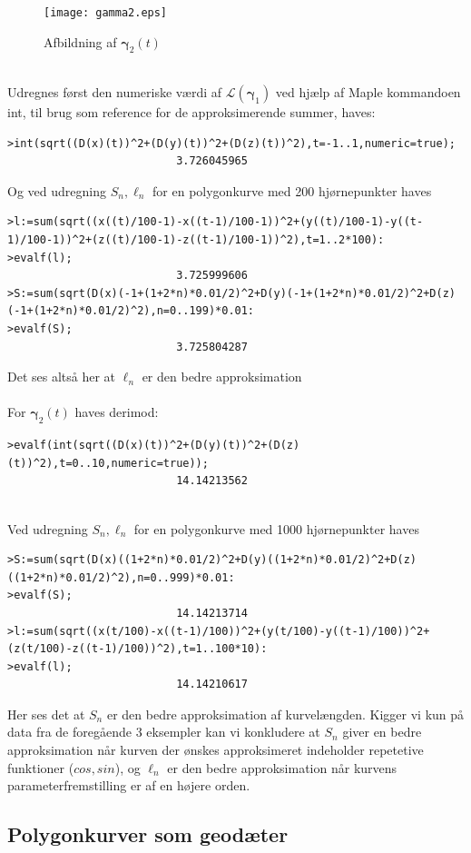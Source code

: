 \begin{figure}[ht]
\center
\texttt{[image: gamma2.eps]}
\caption{Afbildning af \(\pmb{\gamma}_2(t)\)}
\label{gamma2graf}
\end{figure}
\\
Udregnes først den numeriske værdi af \(\mathscr{L}(\pmb{\gamma}_1)\) ved hjælp af Maple kommandoen int, til brug som reference for de approksimerende summer, haves:
\begin{lstlisting}[caption=Reference til \(\mathscr{L}(\pmb{\gamma}_1)\)]
>int(sqrt((D(x)(t))^2+(D(y)(t))^2+(D(z)(t))^2),t=-1..1,numeric=true);
                          3.726045965

\end{lstlisting}
Og ved udregning \(S_n,\ell_n\) for en polygonkurve med 200 hjørnepunkter haves
\begin{lstlisting}[caption={Længden af polygonkurven udregnet hvor \( \mbox{l}=\ell_n\) og \(\mbox{S}=S_n\) }]
>l:=sum(sqrt((x((t)/100-1)-x((t-1)/100-1))^2+(y((t)/100-1)-y((t-1)/100-1))^2+(z((t)/100-1)-z((t-1)/100-1))^2),t=1..2*100):
>evalf(l);
                          3.725999606
>S:=sum(sqrt(D(x)(-1+(1+2*n)*0.01/2)^2+D(y)(-1+(1+2*n)*0.01/2)^2+D(z)(-1+(1+2*n)*0.01/2)^2),n=0..199)*0.01:
>evalf(S);
                          3.725804287

\end{lstlisting}
Det ses altså her at \(\ell_n\) er den bedre approksimation \\
\\
For \(\pmb{\gamma}_2(t)\) haves derimod:
\begin{lstlisting}[caption=Reference til \(\mathscr{L}(\pmb{\gamma}_2)\)]
>evalf(int(sqrt((D(x)(t))^2+(D(y)(t))^2+(D(z)(t))^2),t=0..10,numeric=true));
                          14.14213562


\end{lstlisting}
Ved udregning \(S_n,\ell_n\) for en polygonkurve med 1000 hjørnepunkter haves
\begin{lstlisting}[caption={Længden af polygonkurven udregnet hvor \( \mbox{l}=\ell_n\) og \(\mbox{S}=S_n\) }]
>S:=sum(sqrt(D(x)((1+2*n)*0.01/2)^2+D(y)((1+2*n)*0.01/2)^2+D(z)((1+2*n)*0.01/2)^2),n=0..999)*0.01:
>evalf(S);
                          14.14213714
>l:=sum(sqrt((x(t/100)-x((t-1)/100))^2+(y(t/100)-y((t-1)/100))^2+(z(t/100)-z((t-1)/100))^2),t=1..100*10):
>evalf(l);
                          14.14210617

\end{lstlisting}
Her ses det at \(S_n\) er den bedre approksimation af kurvelængden. Kigger vi kun på data fra de foregående 3 eksempler kan vi konkludere at \(S_n\) giver en bedre approksimation når kurven der ønskes approksimeret indeholder repetetive funktioner (\(cos,sin\)), og \(\ell_n\) er den bedre approksimation når kurvens parameterfremstilling er af en højere orden.

\subsection{Polygonkurver som geodæter}